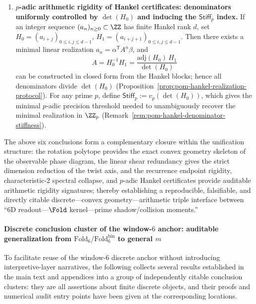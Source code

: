 \begin{theorem}
\begin{enumerate}
  \item \textbf{\(p\)-adic arithmetic rigidity of Hankel certificates: denominators uniformly controlled by \(\det(H_0)\) and inducing the \(\mathsf{Stiff}_p\) index.}
  If an integer sequence \((a_n)_{n\ge 0}\subset\ZZ\) has finite Hankel rank \(d\), set
  \(H_0=(a_{i+j})_{0\le i,j\le d-1}\), \(H_1=(a_{i+j+1})_{0\le i,j\le d-1}\).
  Then there exists a minimal linear realization \(a_n=\alpha^{\mathsf T}A^n\beta\), and
  \[
  A=H_0^{-1}H_1=\frac{\mathrm{adj}(H_0)\,H_1}{\det(H_0)}
  \]
  can be constructed in closed form from the Hankel blocks; hence all denominators divide \(\det(H_0)\) (Proposition~\ref{prop:pom-hankel-realization-protocol}).
  For any prime \(p\), define
  \(
  \mathsf{Stiff}_p:=v_p(\det(H_0))
  \), which gives the minimal \(p\)-adic precision threshold needed to unambiguously recover the minimal realization in \(\ZZ_p\) (Remark~\ref{rem:pom-hankel-denominator-stiffness}).
\end{enumerate}
The above six conclusions form a complementary closure within the unification structure: the rotation polytope provides the exact convex geometry skeleton of the observable phase diagram, the linear shear redundancy gives the strict dimension reduction of the twist axis, and the recurrence endpoint rigidity, characteristic-\(2\) spectral collapse, and \(p\)-adic Hankel certificates provide auditable arithmetic rigidity signatures; thereby establishing a reproducible, falsifiable, and directly citable discrete---convex geometry---arithmetic triple interface between ``6D readout---\(\Fold\) kernel---prime shadow/collision moments.''
\end{theorem}

\paragraph{Discrete conclusion cluster of the window-\(6\) anchor: auditable generalization from \texorpdfstring{$\mathrm{Fold}_6/\mathrm{Fold}^{\mathrm{bin}}_6$}{Fold6/Foldbin6} to general \texorpdfstring{$m$}{m}}
To facilitate reuse of the window-\(6\) discrete anchor without introducing interpretive-layer narratives, the following collects several results established in the main text and appendices into a group of independently citable conclusion clusters: they are all assertions about finite discrete objects, and their proofs and numerical audit entry points have been given at the corresponding locations.


